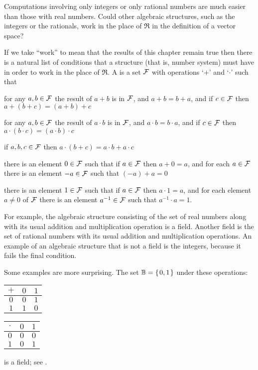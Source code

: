 Computations involving only integers or only rational numbers are much
easier than those with real numbers.
Could other algebraic structures, such as the integers or the rationals,
work in the
place of \( \Re \) in the definition of a vector space?

If we take ``work'' to mean that the results of this chapter
remain true
then there is a natural list of conditions that a structure 
(that is, number system)
must have in order to work in the place of $\Re$.
A  is a set 
\( \mathcal{F} \) with operations
`\( + \)'
and `\( \cdot \)' such that
\begin{tfae}
   \item for any \( a,b\in\mathcal{F} \) the result of \( a+b \) is in \( \mathcal{F} \), and
         \( a+b=b+a \), and
         if \( c\in\mathcal{F} \) then \( a+(b+c)=(a+b)+c \)
   \item for any \( a,b\in\mathcal{F} \) the result of \( a\cdot b \) is in \( \mathcal{F} \), and
         \( a\cdot b=b\cdot a \), and
         if \( c\in\mathcal{F} \) then \( a\cdot (b\cdot c)=(a\cdot b)\cdot c \)
   \item if \( a,b,c\in\mathcal{F} \) then \( a\cdot (b+c)=a\cdot b+a\cdot c \)
   \item there is an element \( 0\in\mathcal{F} \) such that
         if \( a\in\mathcal{F} \) then \( a+0=a \), and
         for each \( a\in\mathcal{F} \) there is an element \( -a\in\mathcal{F} \)
                such that \( (-a)+a=0 \)
   \item there is an element \( 1\in\mathcal{F} \) such that
         if \( a\in\mathcal{F} \) then \( a\cdot 1=a \), and
         for each element \( a\neq 0 \) of \( \mathcal{F} \)
                there is an element \( a^{-1}\in\mathcal{F} \)
                such that \( a^{-1}\cdot a=1 \).
\end{tfae}

For example, the algebraic structure 
consisting of the set of real numbers along with its usual
addition and multiplication operation is a field.
Another field is the set of rational numbers with its usual addition
and multiplication operations.
An example of an algebraic structure that is not a field is
the integers, because it fails the final condition.

Some examples are more surprising.
The set \( \mathbb{B}=\mbox{$\{\hspace{0.1em}0,1\hspace{0.1em}\}$} \) under these operations:
\begin{center}
  \begin{tabular}{c|cc}
    \( + \) &\( 0 \) &\( 1 \) \\
    \hline
    \( 0 \) &\( 0 \) &\( 1 \) \\
    \( 1 \) &\( 1 \) &\( 0 \)
  \end{tabular}
  \qquad
  \begin{tabular}{c|cc}
    \( \cdot \) &\( 0 \) &\( 1 \) \\
     \hline
       \( 0 \)  &\( 0 \) &\( 0 \)  \\
       \( 1 \)  &\( 0 \) &\( 1 \)
  \end{tabular}
\end{center}
is a field; see .

